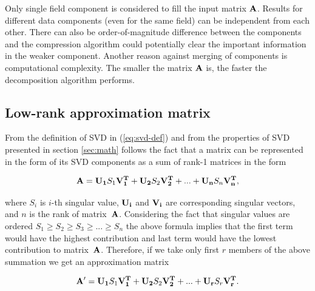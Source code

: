 
Only single field component is considered to fill the input matrix $\mathbf{A}$. Results for different data components (even for the same field) can be independent from each other. There can also be order-of-magnitude difference between the components and the compression algorithm could potentially clear the important information in the weaker component. Another reason against merging of components is computational complexity. The smaller the matrix $\mathbf{A}$ is, the faster the decomposition algorithm performs.

\subsection{Low-rank approximation matrix}

From the definition of SVD in (\ref{eq:svd-def}) and from the properties of SVD presented in section \ref{sec:math} follows the fact that a matrix can be represented in the form of its SVD components as a sum of rank-1 matrices in the form

\begin{equation}
\mathbf{A}=\mathbf{U_{1}}S_{1}\mathbf{V_{1}^{T}}+\mathbf{U_{2}}S_{2}\mathbf{V_{2}^{T}}+ ... +\mathbf{U_{n}}S_{n}\mathbf{V_{n}^{T}},
\label{eq:svd-expansion}
\end{equation}

where $S_{i}$ is $i$-th singular value, $\mathbf{U_{i}}$ and $\mathbf{V_{i}}$ are corresponding singular vectors, and $n$ is the rank of matrix~$\mathbf{A}$. Considering the fact that singular values are ordered $S_{1} \geq S_{2} \geq S_{3} \geq ... \geq S_{n}$ the above formula implies that the first term would have the highest contribution and last term would have the lowest contribution to matrix~$\mathbf{A}$. Therefore, if we take only first $r$ members of the above summation we get an approximation matrix

\begin{equation}
\mathbf{A'}=\mathbf{U_{1}}S_{1}\mathbf{V_{1}^{T}}+\mathbf{U_{2}}S_{2}\mathbf{V_{2}^{T}}+ ... +\mathbf{U_{r}}S_{r}\mathbf{V_{r}^{T}}.
\label{eq:svd-approx-expansion}
\end{equation}

